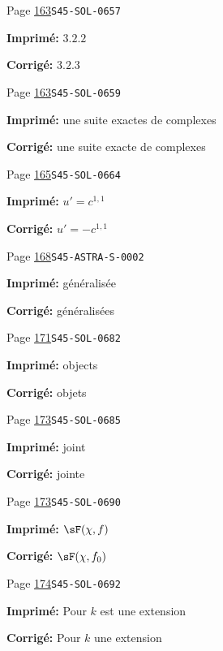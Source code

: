 \documentclass[oneside]{book}
\theoremstyle{sga-source}
\theoremstyle{sga-source-dash}
\theoremstyle{sga-source-dotdash}
\theoremstyle{sga-source-number-note-dash}
\theoremstyle{sga-source-note-number-dotdash}
\theoremstyle{sga-source-example-dotdash}
\theoremstyle{sga-source-inline-number}
\theoremstyle{sga-source-bare-number}
\theoremstyle{sga-source}
\begin{document}
\begin{description}
\smallskip
\item[\hypertarget{apparatus:FR-0133}{133}] Page \hyperlink{printpage:fr:163}{163}\quad\texttt{S45-SOL-0657}
\par\noindent\textbf{Imprimé:} \(3.2.2\)
\par\noindent\textbf{Corrigé:} \(3.2.3\)
\smallskip
\item[\hypertarget{apparatus:FR-0134}{134}] Page \hyperlink{printpage:fr:163}{163}\quad\texttt{S45-SOL-0659}
\par\noindent\textbf{Imprimé:} une suite exactes de complexes
\par\noindent\textbf{Corrigé:} une suite exacte de complexes
\smallskip
\item[\hypertarget{apparatus:FR-0135}{135}] Page \hyperlink{printpage:fr:165}{165}\quad\texttt{S45-SOL-0664}
\par\noindent\textbf{Imprimé:} \(u'=c^{1,1}\)
\par\noindent\textbf{Corrigé:} \(u'=-c^{1,1}\)
\smallskip
\item[\hypertarget{apparatus:FR-0136}{136}] Page \hyperlink{printpage:fr:168}{168}\quad\texttt{S45-ASTRA-S-0002}
\par\noindent\textbf{Imprimé:} généralisée
\par\noindent\textbf{Corrigé:} généralisées
\smallskip
\item[\hypertarget{apparatus:FR-0137}{137}] Page \hyperlink{printpage:fr:171}{171}\quad\texttt{S45-SOL-0682}
\par\noindent\textbf{Imprimé:} objects
\par\noindent\textbf{Corrigé:} objets
\smallskip
\item[\hypertarget{apparatus:FR-0138}{138}] Page \hyperlink{printpage:fr:173}{173}\quad\texttt{S45-SOL-0685}
\par\noindent\textbf{Imprimé:} joint
\par\noindent\textbf{Corrigé:} jointe
\smallskip
\item[\hypertarget{apparatus:FR-0139}{139}] Page \hyperlink{printpage:fr:173}{173}\quad\texttt{S45-SOL-0690}
\par\noindent\textbf{Imprimé:} \(\sF(\chi,f)\)
\par\noindent\textbf{Corrigé:} \(\sF(\chi,f_0)\)
\smallskip
\item[\hypertarget{apparatus:FR-0140}{140}] Page \hyperlink{printpage:fr:174}{174}\quad\texttt{S45-SOL-0692}
\par\noindent\textbf{Imprimé:} Pour $k$ est une extension
\par\noindent\textbf{Corrigé:} Pour $k$ une extension

\end{description}
\end{document}

